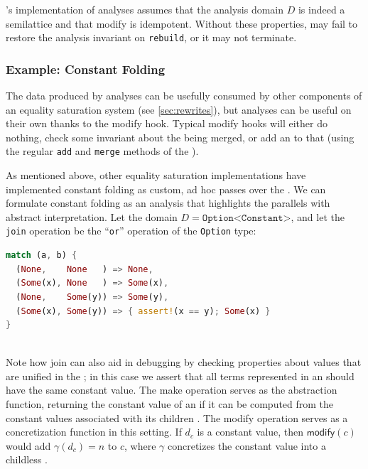 \Egg's implementation of \eclass analyses assumes that the analysis domain $D$
  is indeed a semilattice and that \textsf{modify} is idempotent.
Without these properties, \egg may fail to restore the analysis invariant on
  \texttt{rebuild}, or it may not terminate.

\subsubsection{Example: Constant Folding}

The data produced by \eclass analyses can be
  usefully consumed by other components of an equality saturation system
  (see \autoref{sec:rewrites}),
  but \eclass analyses can be useful on their own thanks to the
  \textsf{modify} hook.
Typical \textsf{modify} hooks will either do nothing, check some invariant about
  the \eclasses being merged, or add an \enode to that \eclass
  (using the regular \texttt{add} and \texttt{merge} methods of the \egraph).

As mentioned above, other equality saturation implementations have implemented
  constant folding as custom, ad hoc passes over the \egraph.
We can formulate constant folding as an \eclass analysis that highlights the
  parallels with abstract interpretation.
Let the domain $D = \texttt{Option<Constant>}$, and let the \texttt{join}
  operation be the ``\texttt{or}'' operation of the \texttt{Option} type:
\\
\begin{minipage}{\linewidth}
\begin{lstlisting}[language=Rust, basicstyle=\ttfamily\footnotesize, xleftmargin=35mm]
match (a, b) {
  (None,    None   ) => None,
  (Some(x), None   ) => Some(x),
  (None,    Some(y)) => Some(y),
  (Some(x), Some(y)) => { assert!(x == y); Some(x) }
}
\end{lstlisting}
\end{minipage}
\\
Note how \textsf{join} can also aid in debugging by checking properties about
  values that are unified in the \egraph;
  in this case we assert that all terms represented in an \eclass should have
  the same constant value.
The \textsf{make} operation serves as the abstraction function, returning the
  constant value of an \enode if it can be computed from the constant values
  associated with its children \eclasses.
The \textsf{modify} operation serves as a concretization function in this
  setting.
If $d_{c}$ is a constant value, then $\textsf{modify}(c)$ would add
  $\gamma(d_{c}) = n$ to $c$, where $\gamma$ concretizes the constant value into
  a childless \enode.

